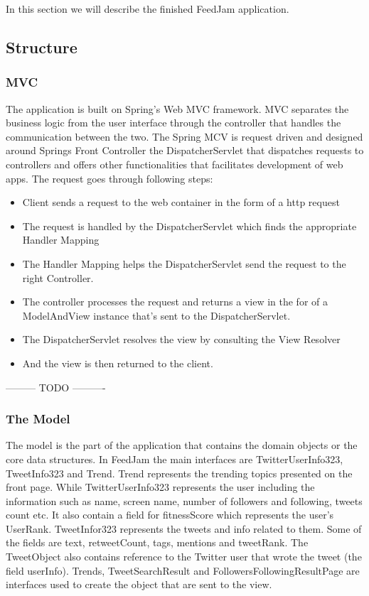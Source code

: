 In this section we will describe the finished FeedJam application.
\subsection{Structure}

\subsubsection{MVC} %
The application is built on Spring's Web MVC framework. MVC separates the business logic from the user interface through the controller that handles the communication between the two. The Spring MCV is request driven and designed around Springs Front Controller the DispatcherServlet that dispatches requests to controllers and offers other functionalities that facilitates development of web apps. The request goes through following steps:

\begin{itemize}
\item Client sends a request to the web container in the form of a http request
\item The request is handled by the DispatcherServlet which finds the appropriate Handler Mapping
\item The Handler Mapping helps the DispatcherServlet send the request to the right Controller. 
\item The controller processes the request and returns a view in the for of a ModelAndView instance that's sent to the DispatcherServlet. 
\item The DispatcherServlet resolves the view by consulting the View Resolver
\item And the view is then returned to the client. 
\end{itemize}

--------- TODO ---------- 


\subsubsection{The Model} %
The model is the part of the application that contains the domain objects or the core data structures. In FeedJam the main interfaces are TwitterUserInfo323, TweetInfo323 and Trend. Trend represents the trending topics presented on the front page. While TwitterUserInfo323 represents the user including the information such as name, screen name, number of followers and following, tweets count etc. It also contain a field for fitnessScore which represents the user's UserRank. TweetInfor323 represents the tweets and info related to them. Some of the fields are text, retweetCount, tags, mentions and tweetRank. The TweetObject also contains reference to the Twitter user that wrote the tweet (the field userInfo). Trends, TweetSearchResult and FollowersFollowingResultPage are interfaces used to create the object that are sent to the view. 

